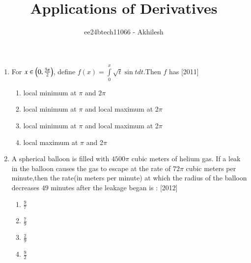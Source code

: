 \documentclass[journal,12pt,twocolumn]{IEEEtran}
\theoremstyle{remark}
\begin{document}

\vspace{3cm}

\title{Applications of Derivatives}
\author{ee24btech11066 - Akhilesh}
\maketitle
\newpage
\bigskip

\renewcommand{\thefigure}{\theenumi}
\renewcommand{\thetable}{\theenumi}
\begin{enumerate}
\item For $x \in \left(0,\frac{5\pi}{2}\right)$, define $f(x)=\int\limits_0^x\sqrt{t}\sin t dt$.Then $f$ has \hfill{[2011]}\\
\begin{enumerate}
    \item   local minimum at $\pi$ and $2\pi$\\
    \item   local minimum at $\pi$ and local maximum at 2$\pi$
    \item   local minimum at $\pi$ and local maximum at 2$\pi$
    \item   local maximum at $\pi$ and 2$\pi$\\
\end{enumerate}
    
\item A spherical balloon is filled with $4500\pi$ cubic meters of helium gas. If a leak in the balloon causes the gas to escape at the rate of $72\pi$ cubic meters per minute,then the rate{(in meters per minute)} at which the radius of the balloon decreases $49$ minutes after the leakage began is : \hfill{[2012]}\\
\begin{enumerate}
    \item   $\frac{9}{7}$\\
    \item   $\frac{7}{9}$\\
    \item   $\frac{2}{9}$\\
    \item   $\frac{9}{2}$\\
\end{enumerate} 


\end{enumerate}
\end{document}
